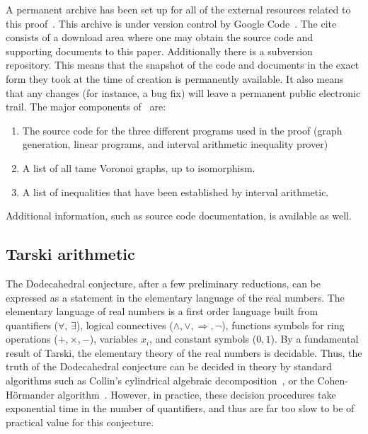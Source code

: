 \documentclass{article} %
\begin{document}
A permanent archive has been set up for all of the external resources
related to this proof~\cite{McLaughlin:2008:KeplerCode}. This archive
is under version control by Google Code~\cite{website:GoogleCode}. The
cite consists of a download area where one may obtain the source code
and supporting documents to this paper. Additionally there is a
subversion~\cite{CollinsSussman:2005:Subversion} repository. This
means that the snapshot of the code and documents in the exact form
they took at the time of creation is permanently available. It
also means that any changes (for instance, a bug fix) will leave a
permanent public electronic trail. The major components
of~\cite{McLaughlin:2008:KeplerCode} are:
\begin{enumerate}
\item The source code for the three different programs used in the proof (graph generation, linear programs, and interval arithmetic inequality prover)
\item A list of all tame Voronoi graphs, up to isomorphism.
\item A list of inequalities that have been established by interval arithmetic.
\end{enumerate}
Additional information, such as source code documentation, is available
as well.

\subsection{Tarski arithmetic}


The Dodecahedral conjecture, after a few preliminary reductions, can
be expressed as a statement in the elementary language of the real
numbers. The elementary language of real numbers is a first order
language built from quantifiers ($\forall,\,\exists$), logical
connectives ($\land,\lor,\Rightarrow,\neg$), functions symbols for
ring operations ($+,\times,-$), variables $x_i$, and constant symbols
($0,1$). By a fundamental result of Tarski, the elementary theory of
the real numbers is decidable. Thus, the truth of the Dodecahedral
conjecture can be decided in theory by standard algorithms such as
Collin's cylindrical algebraic decomposition~\cite{Collins:1975:ATFL},
or the Cohen-H\"ormander algorithm~\cite{Hormander:1983:PDO}. However,
in practice, these decision procedures take exponential time in the
number of quantifiers, and thus are far too slow to be of practical
value for this conjecture.
\end{document}

